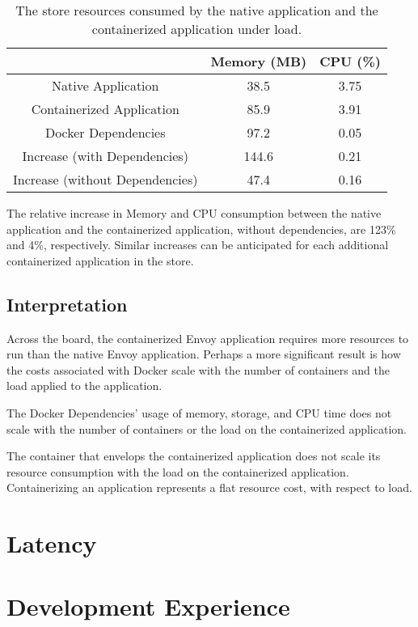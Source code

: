 \documentclass{article}
\begin{document}
\begin{table}[H]
\begin{tabular}{ |c|c|c| }
 \hline
   & Memory (MB) & CPU (\%) \\ 
 \hline
 Native Application & 38.5 & 3.75 \\
 \hline
 Containerized Application & 85.9 & 3.91 \\
 \hline
 Docker Dependencies & 97.2 & 0.05 \\
 \hline\hline
 Increase (with Dependencies) & 144.6 & 0.21 \\
 \hline
 Increase (without Dependencies) & 47.4 & 0.16 \\
 \hline
\end{tabular}
\caption{The store resources consumed by the native application and the containerized application under load.}
\label{table:2}
\end{table}

The relative increase in Memory and CPU consumption between the native application and the containerized application, without dependencies, are 123\% and 4\%, respectively. Similar increases can be anticipated for each additional containerized application in the store.

\subsection{Interpretation}
Across the board, the containerized Envoy application requires more resources to run than the native Envoy application. Perhaps a more significant result is how the costs associated with Docker scale with the number of containers and the load applied to the application.

The Docker Dependencies' usage of memory, storage, and CPU time does not scale with the number of containers or the load on the containerized application.

The container that envelops the containerized application does not scale its resource consumption with the load on the containerized application. Containerizing an application represents a flat resource cost, with respect to load.

\section{Latency}

\section{Development Experience}
\end{document}
